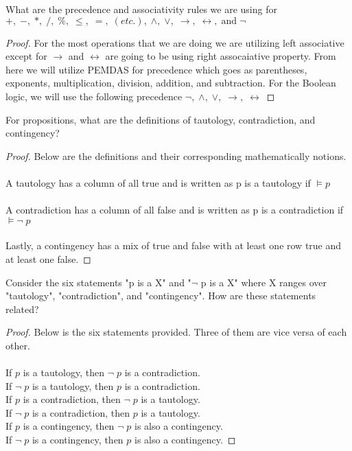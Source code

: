 \documentclass[12pt]{article}
\newenvironment{exercise}[2][Exercise]{\begin{trivlist}
\item[\hskip \labelsep {\bfseries #1}\hskip \labelsep {\bfseries #2.}]}{\end{trivlist}}
\begin{document}
\begin{exercise}{13}
What are the precedence and associativity rules we are using for $+,\; -,\; *,\; /,\; \%,\; \leq,\; =,\; (etc.),\; \land,\; \lor,\; \rightarrow,\; \leftrightarrow,\; \text{and}\; \neg$
\end{exercise}

\begin{proof}
For the most operations that we are doing we are utilizing left associative except for $\rightarrow$ and $\leftrightarrow$ are going to be using right assocaiative property. From here we will utilize PEMDAS for precedence which goes as parentheses, exponents, multiplication, division, addition, and subtraction. For the Boolean logic, we will use the following precedence $\neg,\; \land,\; \lor,\; \rightarrow,\; \leftrightarrow$

\end{proof}

\begin{exercise}{14}
For propositions, what are the definitions of tautology, contradiction, and contingency? 
\end{exercise}

\begin{proof}
Below are the definitions and their corresponding mathematically notions. \\ \\ 
A tautology has a column of all true and is written as p is a tautology if $\models p$ \\ \\ 
A contradiction has a column of all false and is written as p is a contradiction if $\models \neg\; p$ \\ \\ 
Lastly, a contingency has a mix of true and false with at least one row true and at least one false.

\end{proof}

\begin{exercise}{15}
Consider the six statements "p is a X" and "$\neg$ p is a X" where X ranges over "tautology", "contradiction", and "contingency". How are these statements related? 
\end{exercise}

\begin{proof} 
Below is the six statements provided. Three of them are vice versa of each other. \\ \\
If $p$ is a tautology, then $\neg\; p$ is a contradiction. \\
If $\neg\; p$ is a tautology, then $p$ is a contradiction. \\
If $p$ is a contradiction, then $\neg\; p$ is a tautology. \\ 
If $\neg\; p$ is a contradiction, then $p$ is a tautology. \\ 
If $p$ is a contingency, then $\neg\; p$ is also a contingency. \\ 
If $\neg\; p$ is a contingency, then $p$ is also a contingency. 

\end{proof}
\end{document}
